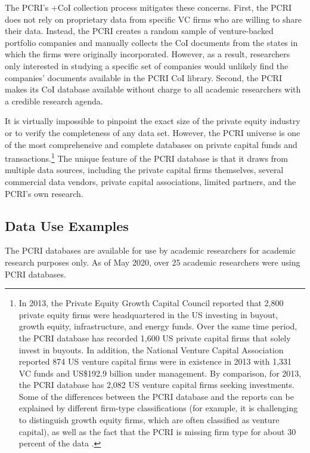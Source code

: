 \documentclass[
]{book}
\begin{document}
The PCRI's +CoI\textbar{} collection process mitigates these concerns. First, the PCRI does not rely on proprietary data from specific VC firms who are willing to share their data. Instead, the PCRI creates a random sample of venture-backed portfolio companies and manually collects the CoI documents from the states in which the firms were originally incorporated. However, as a result, researchers only interested in studying a specific set of companies would unlikely find the companies' documents available in the PCRI CoI library. Second, the PCRI makes its CoI database available without charge to all academic researchers with a credible research agenda.

It is virtually impossible to pinpoint the exact size of the private equity industry or to verify the completeness of any data set. However, the PCRI universe is one of the most comprehensive and complete databases on private capital funds and transactions.\footnote{In 2013, the Private Equity Growth Capital Council \citep{privateequitygrowthcapitalcouncil2013} reported that 2,800 private equity firms were headquartered in the US investing in buyout, growth equity, infrastructure, and energy funds. Over the same time period, the PCRI database has recorded 1,600 US private capital firms that solely invest in buyouts. In addition, the National Venture Capital Association reported 874 US venture capital firms were in existence in 2013 with 1,331 VC funds and US\$192.9 billion under management. By comparison, for 2013, the PCRI database has 2,082 US venture capital firms seeking investments. Some of the differences between the PCRI database and the reports can be explained by different firm-type classifications (for example, it is challenging to distinguish growth equity firms, which are often classified as venture capital), as well as the fact that the PCRI is missing firm type for about 30 percent of the data \citep{jeng2015}.} The unique feature of the PCRI database is that it draws from multiple data sources, including the private capital firms themselves, several commercial data vendors, private capital associations, limited partners, and the PCRI's own research.

\hypertarget{data-use-examples-3}{%
\subsection{Data Use Examples}\label{data-use-examples-3}}

The PCRI databases are available for use by academic researchers for academic research purposes only. As of May 2020, over 25 academic researchers were using PCRI databases.
\end{document}
